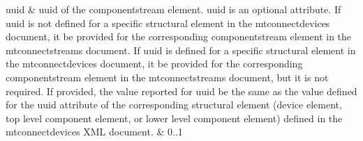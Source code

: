 \begin{longtabu}
\gls{uuid}
&
\gls{uuid} of the \gls{componentstream} element.
\newline \gls{uuid} is an optional attribute.
\newline If \gls{uuid} is not defined for a specific \gls{structural element} in the
\gls{mtconnectdevices} document, it \MUSTNOT be provided for the
corresponding \gls{componentstream} element in the
\gls{mtconnectstreams} document.
\newline If \gls{uuid} is defined for a specific \gls{structural element} in the
\gls{mtconnectdevices} document, it \MAY be provided for the
corresponding \gls{componentstream} element in the
\gls{mtconnectstreams} document, but it is not required.
\newline If provided, the value reported for \gls{uuid} \MUST be the same as the
value defined for the \gls{uuid} attribute of the corresponding \gls{structural element} (\gls{device} element, \gls{top level} \gls{component} element, or \gls{lower level} \gls{component} element) defined in the \gls{mtconnectdevices}
XML document.
&
0..1 \\
\hline


\end{longtabu}
